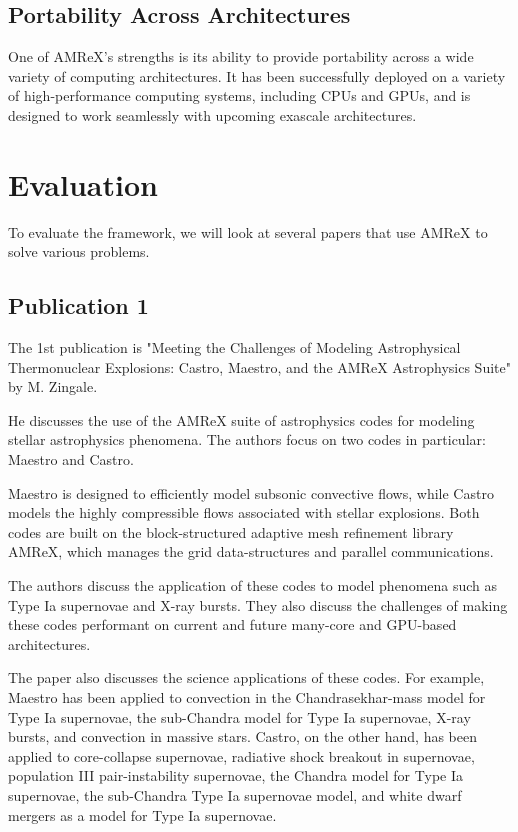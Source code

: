 \documentclass[12pt, a4paper]{scrartcl}
\begin{document}
\subsection{Portability Across Architectures}

One of AMReX's strengths is its ability to provide portability across a wide variety 
of computing architectures. It has been successfully deployed on a variety of high-performance 
computing systems, including CPUs and GPUs, and is designed to work seamlessly 
with upcoming exascale architectures.

\section{Evaluation}

To evaluate the framework, we will look at several papers that use AMReX to solve various problems.

\subsection{Publication 1}

The 1st publication is "Meeting the Challenges of Modeling Astrophysical Thermonuclear Explosions: 
Castro, Maestro, and the AMReX Astrophysics Suite" by M. Zingale.

He discusses the use of the AMReX suite of astrophysics codes for modeling stellar astrophysics phenomena. 
The authors focus on two codes in particular: Maestro and Castro.

Maestro is designed to efficiently model subsonic convective flows, while Castro models the highly 
compressible flows associated with stellar explosions. Both codes are built on the block-structured 
adaptive mesh refinement library AMReX, which manages the grid data-structures and parallel communications.

The authors discuss the application of these codes to model phenomena such as Type Ia supernovae and X-ray bursts.
They also discuss the challenges of making these codes performant on current and future many-core and GPU-based architectures.

The paper also discusses the science applications of these codes. For example, Maestro has been applied to 
convection in the Chandrasekhar-mass model for Type Ia supernovae, the sub-Chandra model for Type Ia 
supernovae, X-ray bursts, and convection in massive stars. Castro, on the other hand, has been applied to 
core-collapse supernovae, radiative shock breakout in supernovae, population III pair-instability 
supernovae, the Chandra model for Type Ia supernovae, the sub-Chandra Type Ia supernovae model, and white 
dwarf mergers as a model for Type Ia supernovae.
\end{document}
